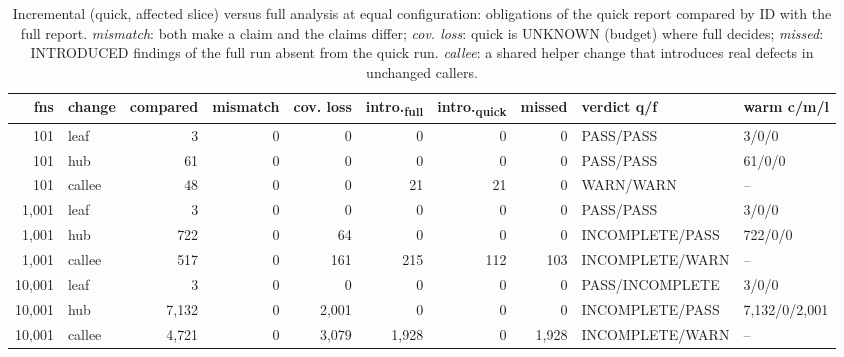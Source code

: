 \begin{table}[t]
\centering
\small

\caption{Incremental (quick, affected slice) versus full analysis at equal configuration: obligations of the quick report compared by ID with the full report. \emph{mismatch}: both make a claim and the claims differ; \emph{cov. loss}: quick is UNKNOWN (budget) where full decides; \emph{missed}: INTRODUCED findings of the full run absent from the quick run. \emph{callee}: a shared helper change that introduces real defects in unchanged callers.}
\label{tab:consistency}
\begin{tabular}{rlrrrrrrll}
\toprule
fns & change & compared & mismatch & cov. loss & intro.\textsubscript{full} & intro.\textsubscript{quick} & missed & verdict q/f & warm c/m/l \\
\midrule
101 & leaf & 3 & 0 & 0 & 0 & 0 & 0 & PASS/PASS & 3/0/0 \\
101 & hub & 61 & 0 & 0 & 0 & 0 & 0 & PASS/PASS & 61/0/0 \\
101 & callee & 48 & 0 & 0 & 21 & 21 & 0 & WARN/WARN & -- \\
1{,}001 & leaf & 3 & 0 & 0 & 0 & 0 & 0 & PASS/PASS & 3/0/0 \\
1{,}001 & hub & 722 & 0 & 64 & 0 & 0 & 0 & INCOMPLETE/PASS & 722/0/0 \\
1{,}001 & callee & 517 & 0 & 161 & 215 & 112 & 103 & INCOMPLETE/WARN & -- \\
10{,}001 & leaf & 3 & 0 & 0 & 0 & 0 & 0 & PASS/INCOMPLETE & 3/0/0 \\
10{,}001 & hub & 7{,}132 & 0 & 2{,}001 & 0 & 0 & 0 & INCOMPLETE/PASS & 7{,}132/0/2{,}001 \\
10{,}001 & callee & 4{,}721 & 0 & 3{,}079 & 1{,}928 & 0 & 1{,}928 & INCOMPLETE/WARN & -- \\
\bottomrule
\end{tabular}
\end{table}
